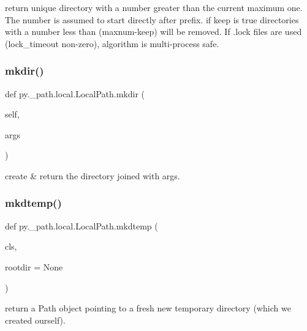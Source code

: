 \begin{DoxyVerb}return unique directory with a number greater than the current
    maximum one.  The number is assumed to start directly after prefix.
    if keep is true directories with a number less than (maxnum-keep)
    will be removed. If .lock files are used (lock_timeout non-zero),
    algorithm is multi-process safe.
\end{DoxyVerb}
 \mbox{\label{classpy_1_1__path_1_1local_1_1_local_path_a999167bfced1b2b3ffa8701313b8c1bb}} 
\subsubsection{\texorpdfstring{mkdir()}{mkdir()}}
{\footnotesize\ttfamily def py.\+\_\+path.\+local.\+Local\+Path.\+mkdir (\begin{DoxyParamCaption}\item[{}]{self,  }\item[{}]{args }\end{DoxyParamCaption})}

\begin{DoxyVerb}create & return the directory joined with args. \end{DoxyVerb}
 \mbox{\label{classpy_1_1__path_1_1local_1_1_local_path_a828273172c32f44027e6b86fce674da3}} 
\subsubsection{\texorpdfstring{mkdtemp()}{mkdtemp()}}
{\footnotesize\ttfamily def py.\+\_\+path.\+local.\+Local\+Path.\+mkdtemp (\begin{DoxyParamCaption}\item[{}]{cls,  }\item[{}]{rootdir = {\ttfamily None} }\end{DoxyParamCaption})}

\begin{DoxyVerb}return a Path object pointing to a fresh new temporary directory
    (which we created ourself).
\end{DoxyVerb}
 \mbox{\label{classpy_1_1__path_1_1local_1_1_local_path_a2cdcbc07a482fec0c653cd6c935c1ef4}} 
